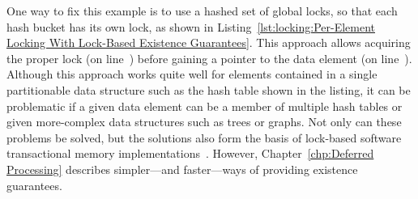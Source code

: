 \begin{lineref}
One way to fix this example is to use a hashed set of global locks, so
that each hash bucket has its own lock, as shown in
Listing~\ref{lst:locking:Per-Element Locking With Lock-Based Existence Guarantees}.
This approach allows acquiring the proper lock (on line~) before
gaining a pointer to the data element (on line~).
Although this approach works quite well for elements contained in a
single partitionable data structure such as the hash table shown in the
listing, it can be problematic if a given data element can be a member
of multiple hash tables or given more-complex data structures such
as trees or graphs.
Not only can these problems be solved, but the solutions also form
the basis of lock-based software transactional memory
implementations~\cite{Shavit95,DaveDice2006DISC}.
However,
Chapter~\ref{chp:Deferred Processing}
describes simpler---and faster---ways of providing existence guarantees.
\end{lineref}

